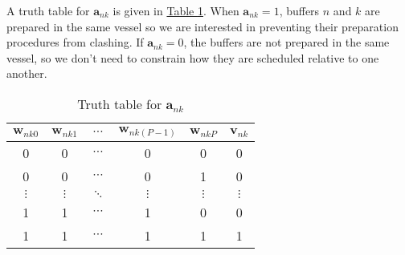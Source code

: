 A truth table for $\boldsymbol{a}_{nk}$ is given in
\hyperref[tbl.trutha]{Table \ref*{tbl.trutha}}.
When $\boldsymbol{a}_{nk} = 1$, buffers $n$ and $k$ are prepared in the same
vessel so we are interested in preventing their preparation procedures from
clashing. If $\boldsymbol{a}_{nk} = 0$, the buffers are not prepared in the 
same vessel, so we don't need to constrain how they are scheduled relative to
one another.
\begin{table}[h!]
    \centering
    \caption{Truth table for $\boldsymbol{a}_{nk}$}
    \label{tbl.trutha}
    \begin{tabular}{c c c c c | c}
        $\boldsymbol{w}_{nk0}$ & $\boldsymbol{w}_{nk1}$ & $\cdots$
        & $\boldsymbol{w}_{nk\left(P-1\right)}$ & $\boldsymbol{w}_{nkP}$
        & $\boldsymbol{v}_{nk}$ \\ \hline
        0 & 0 & $\cdots$ & 0 & 0 & 0\\
        0 & 0 & $\cdots$ & 0 & 1 & 0\\
        $\vdots$ & $\vdots$ & $\ddots$ & $\vdots$& $\vdots$ & $\vdots$\\
        1 & 1 & $\cdots$ & 1 & 0 & 0\\
        1 & 1 & $\cdots$ & 1 & 1 & 1\\
    \end{tabular}
\end{table}

